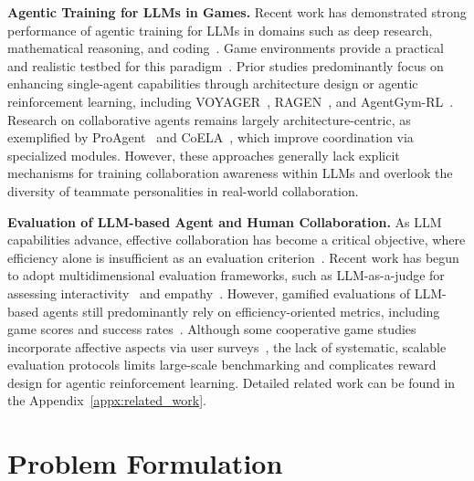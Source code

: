\documentclass{article}
\theoremstyle{plain}
\theoremstyle{definition}
\theoremstyle{remark}
\begin{document}
\textbf{Agentic Training for LLMs in Games.} Recent work has demonstrated strong performance of agentic training for LLMs in domains such as deep research, mathematical reasoning, and coding~\cite{jin2025search,guo2025deepseek,jiang2024survey}. Game environments provide a practical and realistic testbed for this paradigm~\cite{Chevalier-Boisvert19,CarrollSHGSAD19,ShridharYCBTH21,PuigSLWLTF021,WangX0MXZFA24}. Prior studies predominantly focus on enhancing single-agent capabilities through architecture design or agentic reinforcement learning, including VOYAGER~\cite{WangX0MXZFA24}, RAGEN~\cite{wang2025ragen}, and AgentGym-RL~\cite{xi2025agentgymrl}. Research on collaborative agents remains largely architecture-centric, as exemplified by ProAgent~\cite{ZhangYHWLSZZLZC24} and CoELA~\cite{ZhangDSZDTSG24}, which improve coordination via specialized modules. However, these approaches generally lack explicit mechanisms for training collaboration awareness within LLMs and overlook the diversity of teammate personalities in real-world collaboration.

\textbf{Evaluation of LLM-based Agent and Human Collaboration.} As LLM capabilities advance, effective collaboration has become a critical objective, where efficiency alone is insufficient as an evaluation criterion~\cite{george1990personality,mcallister1995affect,salas2005there}. Recent work has begun to adopt multidimensional evaluation frameworks, such as LLM-as-a-judge for assessing interactivity~\cite{WuGP0LDC0L025} and empathy~\cite{zhang2025echo}. However, gamified evaluations of LLM-based agents still predominantly rely on efficiency-oriented metrics, including game scores and success rates~\cite{costarelli2024gamebench,hu2025lmgame,sun2025collab,zhang2025paracook}. Although some cooperative game studies incorporate affective aspects via user surveys~\cite{SiuPCZLPCA21,ZhangDSZDTSG24}, the lack of systematic, scalable evaluation protocols limits large-scale benchmarking and complicates reward design for agentic reinforcement learning. Detailed related work can be found in the Appendix~\ref{appx:related_work}.


\section{Problem Formulation}
\end{document}
